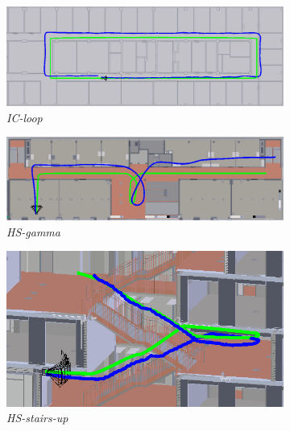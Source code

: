 \begin{figure}[H]
	\centering
	\begin{subfigure}[t]{1.0\linewidth}
		\centering
		\includegraphics[width=\linewidth]{images/trajectories/ic_traj.png}
		\caption{\textit{IC-loop}}
		\label{subfig:traj_ic}
	\end{subfigure}
	\hfill \medskip
	\begin{subfigure}[t]{1.0\linewidth}
		\centering
		\includegraphics[width=\linewidth]{images/trajectories/hs_gamma.png}
		\caption{\textit{HS-gamma}}
		\label{subfig:traj_hs_gamma}
	\end{subfigure}
	\hfill \medskip
	\begin{subfigure}[tr]{0.45\linewidth}
		\flushleft
		\includegraphics[width=\linewidth]{images/trajectories/hs_up.png}
		\caption{\textit{HS-stairs-up}}
		\label{subfig:traj_hs-up}
	\end{subfigure}
	\hfill
	\begin{subfigure}[tl]{0.45\linewidth}

\end{subfigure}
\end{figure}
